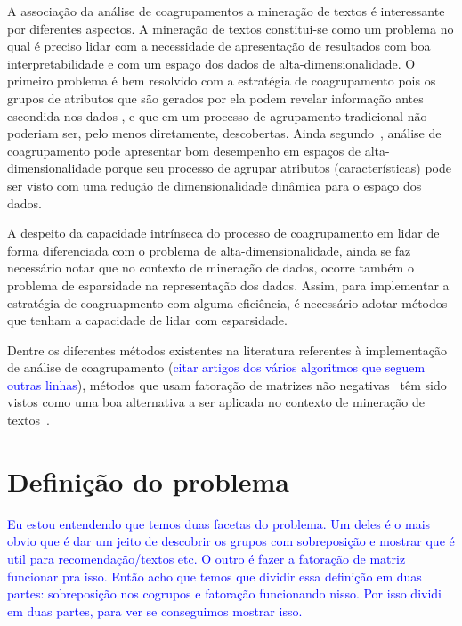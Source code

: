 \documentclass[
    12pt,                %
    oneside,            %
    a4paper,            %
    english,            %
    brazil                %
    ]{abntex2ppgsi}
\begin{document}
A associação da análise de coagrupamentos a mineração de textos é interessante por diferentes aspectos. A mineração de textos constitui-se como um problema no qual é preciso lidar com a necessidade de apresentação de resultados com boa interpretabilidade e com um espaço dos dados de alta-dimensionalidade. O primeiro problema é bem resolvido com a estratégia de coagrupamento pois os grupos de atributos que são gerados por ela podem revelar informação antes escondida nos dados \cite{Tjhi2009}, e que em um processo de agrupamento tradicional não poderiam ser, pelo menos diretamente, descobertas. Ainda segundo~\cite{Tjhi2009}, análise de coagrupamento pode apresentar bom desempenho em espaços de alta-dimensionalidade porque seu processo de agrupar atributos (características) pode ser visto com uma redução de dimensionalidade dinâmica para o espaço dos dados.

A despeito da capacidade intrínseca do processo de coagrupamento em lidar de forma diferenciada com o problema de alta-dimensionalidade, ainda se faz necessário notar que no contexto de mineração de dados, ocorre também o problema de esparsidade na representação dos dados. Assim, para implementar a estratégia de coagruapmento com alguma eficiência, é necessário adotar métodos que tenham a capacidade de lidar com esparsidade.

Dentre os diferentes métodos existentes na literatura referentes à implementação de análise de coagrupamento (\textcolor{blue}{citar artigos dos vários algoritmos que seguem outras linhas}), métodos que usam fatoração de matrizes não negativas~\cite{lee:nnmf00, lee99} têm sido vistos como uma boa alternativa a ser aplicada no contexto de mineração de textos~\cite{Xu2003, Shahnaz2006373, Yoo2010}.


\section{Definição do problema}

\textcolor{blue}{Eu estou entendendo que temos duas facetas do problema. Um deles é o mais obvio que é dar um jeito de descobrir os grupos com sobreposição e mostrar que é util para recomendação/textos etc. O outro é fazer a fatoração de matriz funcionar pra isso. Então acho que temos que dividir essa definição em duas partes: sobreposição nos cogrupos e fatoração funcionando nisso. Por isso dividi em duas partes, para ver se conseguimos mostrar isso.}
\end{document}
